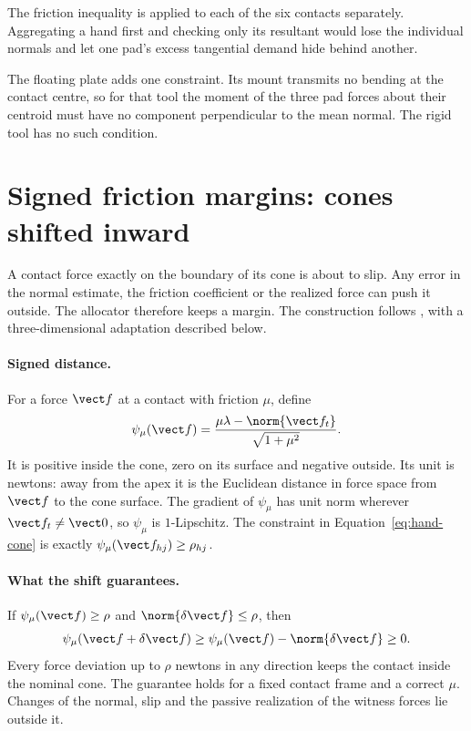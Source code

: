 The friction inequality is applied to each of the six contacts separately. Aggregating a hand first and checking only its resultant would lose the individual normals and let one pad's excess tangential demand hide behind another.

The floating plate adds one constraint. Its mount transmits no bending at the contact centre, so for that tool the moment of the three pad forces about their centroid must have no component perpendicular to the mean normal. The rigid tool has no such condition.

\section{Signed friction margins: cones shifted inward}
\label{sec:signed-margin}

A contact force exactly on the boundary of its cone is about to slip. Any error in the normal estimate, the friction coefficient or the realized force can push it outside. The allocator therefore keeps a margin. The construction follows \citet{frictioncone2026}, with a three-dimensional adaptation described below.

\paragraph{Signed distance.}
For a force $\vect f$ at a contact with friction $\mu$, define
\begin{equation}
\psi_\mu(\vect f)=\frac{\mu\lambda-\norm{\vect f_t}}{\sqrt{1+\mu^2}}.
\label{eq:signed-distance}
\end{equation}
It is positive inside the cone, zero on its surface and negative outside. Its unit is newtons: away from the apex it is the Euclidean distance in force space from $\vect f$ to the cone surface. The gradient of $\psi_\mu$ has unit norm wherever $\vect f_t\neq\vect0$, so $\psi_\mu$ is $1$-Lipschitz. The constraint in Equation~\eqref{eq:hand-cone} is exactly $\psi_\mu(\vect f_{hj})\geq\rho_{hj}$.

\paragraph{What the shift guarantees.}
If $\psi_\mu(\vect f)\geq\rho$ and $\norm{\delta\vect f}\leq\rho$, then
\begin{equation}
\psi_\mu(\vect f+\delta\vect f)\geq\psi_\mu(\vect f)-\norm{\delta\vect f}\geq0.
\end{equation}
Every force deviation up to $\rho$ newtons in any direction keeps the contact inside the nominal cone. The guarantee holds for a fixed contact frame and a correct $\mu$. Changes of the normal, slip and the passive realization of the witness forces lie outside it.

